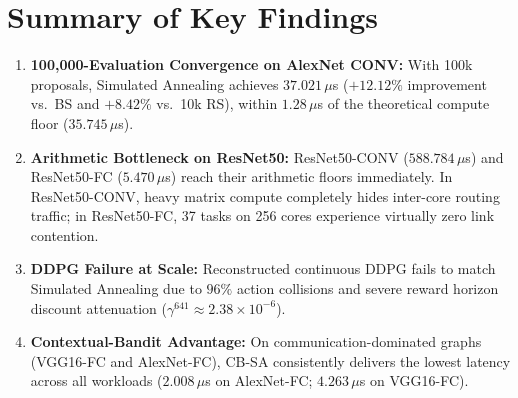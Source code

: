 \documentclass[10pt,conference]{IEEEtran}
\begin{document}
\section{Summary of Key Findings}
\begin{enumerate}
  \item \textbf{100,000-Evaluation Convergence on AlexNet CONV:} With 100k proposals, Simulated Annealing achieves $37.021\,\mu$s ($+12.12\%$ improvement vs.\ BS and $+8.42\%$ vs.\ 10k RS), within $1.28\,\mu$s of the theoretical compute floor ($35.745\,\mu$s).
  \item \textbf{Arithmetic Bottleneck on ResNet50:} ResNet50-CONV ($588.784\,\mu$s) and ResNet50-FC ($5.470\,\mu$s) reach their arithmetic floors immediately. In ResNet50-CONV, heavy matrix compute completely hides inter-core routing traffic; in ResNet50-FC, 37 tasks on 256 cores experience virtually zero link contention.
  \item \textbf{DDPG Failure at Scale:} Reconstructed continuous DDPG fails to match Simulated Annealing due to $96\%$ action collisions and severe reward horizon discount attenuation ($\gamma^{641} \approx 2.38 \times 10^{-6}$).
  \item \textbf{Contextual-Bandit Advantage:} On communication-dominated graphs (VGG16-FC and AlexNet-FC), CB-SA consistently delivers the lowest latency across all workloads ($2.008\,\mu$s on AlexNet-FC; $4.263\,\mu$s on VGG16-FC).
\end{enumerate}
\end{document}
